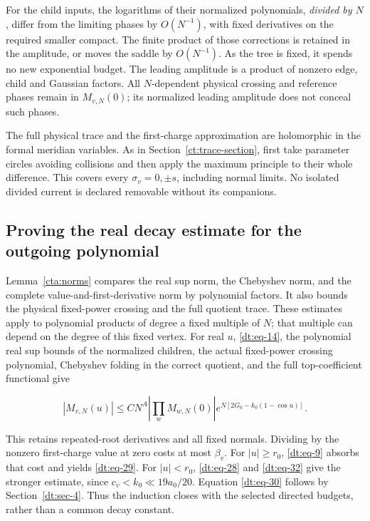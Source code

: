 For the child inputs, the logarithms of their normalized polynomials,
\emph{divided by $N$}, differ from the limiting phases by
$O(N^{-1})$, with fixed derivatives on the required smaller compact. The finite product of those corrections is retained
in the amplitude, or moves the saddle by \(O(N^{-1})\). As the tree is fixed,
it spends no new exponential budget. The leading amplitude is a product
of nonzero edge, child and Gaussian factors. All $N$-dependent physical
crossing and reference phases remain in \(M_{v,N}(0)\); its normalized leading
amplitude does not conceal such phases.

The full physical trace and the first-charge approximation are
holomorphic in the formal meridian variables. As in Section~\ref{ct:trace-section}, first take parameter circles avoiding collisions and then apply
the maximum principle to their whole difference. This covers every
\(\sigma_v=0,\pm s\), including normal limits. No isolated divided
current is declared removable without its companions.

\subsection{Proving the real decay estimate for the outgoing polynomial}\label{dt:sec-6}

Lemma~\ref{cta:norms} compares the real sup norm, the
Chebyshev norm, and the complete value-and-first-derivative norm by
polynomial factors. It also bounds the physical fixed-power crossing
and the full quotient trace. These estimates apply to polynomial
products of degree a fixed multiple of \(N\); that multiple can depend
on the degree of this fixed vertex. For real \(u\), \eqref{dt:eq-14},
the polynomial real sup bounds of the normalized children, the actual
fixed-power crossing polynomial, Chebyshev folding in the correct
quotient, and the full top-coefficient functional give

\begin{equation}\label{dt:eq-43}
|M_{v,N}(u)|\le CN^A
       \left|\prod_wM_{w,N}(0)\right|
                  e^{N[2G_0-k_0(1-\cos u)]}.
\end{equation}

This retains repeated-root derivatives and all fixed normals. Dividing
by the nonzero first-charge value at zero costs at most \(\beta_v\). For
\(|u|\ge r_0\), \eqref{dt:eq-9} absorbs that cost and yields \eqref{dt:eq-29}. For \(|u|<r_0\), \eqref{dt:eq-28}
and \eqref{dt:eq-32} give the stronger estimate, since \(c_v<k_0\ll19a_0/20\).
Equation \eqref{dt:eq-30} follows by Section~\ref{dt:sec-4}. Thus the induction closes with
the selected directed budgets, rather than a common decay constant.

